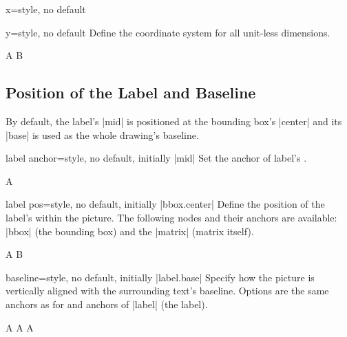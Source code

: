 \begin{docDmKey}[][docmulti]x{=}{style, no default}
\end{docDmKey}
\begin{docDmKey}y{=}{style, no default}
    Define the coordinate system for all unit-less dimensions.
    \begin{dispExample}
        \drawmatrix[x=.6cm, y=.4cm]A
        \drawmatrix[x=.6cm, y=.4cm, width=1cm]B
    \end{dispExample}
\end{docDmKey}


\subsection{Position of the Label and Baseline}

By default, the label's |mid| is positioned at the bounding box's |center| and
its |base| is used as the whole drawing's baseline.  

\begin{docDmKey}{label anchor}{=}{style, no default, initially |mid|}
    Set the anchor of label's \TikZ {}.
    \begin{dispExample}
        \drawmatrix[label anchor=north]A
    \end{dispExample}
\end{docDmKey}

\begin{docDmKey}{label pos}{=}{style, no default, initially |bbox.center|}
    Define the position of the label's \TikZ {} within the picture.  The
    following nodes and their anchors are available: |bbox| (the bounding box)
    and the |matrix| (matrix itself).
    \begin{dispExample}
        \drawmatrix[label pos=bbox.south]A
        \drawmatrix[label pos=matrix.north west]B
    \end{dispExample}
\end{docDmKey}

\begin{docDmKey}{baseline}{=}{style, no default, initially |label.base|}
    Specify how the picture is vertically aligned with the surrounding text's
    baseline.  Options are the same anchors as for  and anchors of |label| (the label).
    \begin{dispExample}
        A
        \drawmatrix[baseline=label.north]A
        \drawmatrix[baseline=bbox.south]A
    \end{dispExample}
\end{docDmKey}


